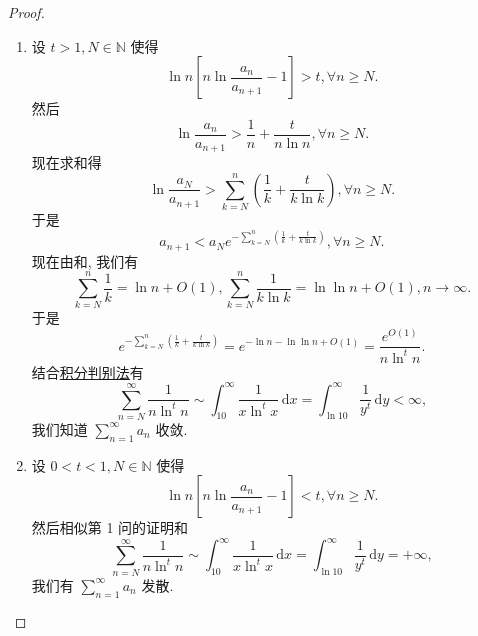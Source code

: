 \documentclass[../../main.tex]{subfiles}
\begin{document}
\begin{proof}
\begin{enumerate}
\item 设 \( t > 1, N \in \mathbb{N} \) 使得
\[
\ln n \left[ n \ln \frac{a_n}{a_{n + 1}} - 1 \right] > t, \forall n \geqslant N.
\]
然后
\[
\ln \frac{a_n}{a_{n + 1}} > \frac{1}{n} + \frac{t}{n \ln n}, \forall n \geqslant N.
\]
现在求和得
\[
\ln \frac{a_N}{a_{n + 1}} > \sum_{k=N}^n \left( \frac{1}{k} + \frac{t}{k \ln k} \right), \forall n \geqslant N.
\]
于是
\[
a_{n + 1} < a_N e^{-\sum\limits_{k=N}^n \left( \frac{1}{k} + \frac{t}{k \ln k} \right)}, \forall n \geqslant N.
\]
现在由和, 我们有
\[
\sum_{k=N}^n \frac{1}{k} = \ln n + O(1), \sum_{k=N}^n \frac{1}{k \ln k} = \ln \ln n + O(1), n \to \infty.
\]
于是
\[
e^{-\sum\limits_{k=N}^n \left( \frac{1}{k} + \frac{t}{k \ln k} \right)} = e^{-\ln n - \ln \ln n + O(1)} = \frac{e^{O(1)}}{n \ln^t n}.
\]
结合\hyperref[theorem:积分判别法]{积分判别法}有
\[
\sum_{n=N}^\infty \frac{1}{n \ln^t n} \sim \int_{10}^\infty \frac{1}{x \ln^t x} \, \mathrm{d}x = \int_{\ln 10}^\infty \frac{1}{y^t} \, \mathrm{d}y < \infty,
\]
我们知道 \( \sum_{n=1}^\infty a_n \) 收敛.

\item 设 \( 0 < t < 1, N \in \mathbb{N} \) 使得
\[
\ln n \left[ n \ln \frac{a_n}{a_{n + 1}} - 1 \right] < t, \forall n \geqslant N.
\]
然后相似第 1 问的证明和
\[
\sum_{n=N}^\infty \frac{1}{n \ln^t n} \sim \int_{10}^\infty \frac{1}{x \ln^t x} \, \mathrm{d}x = \int_{\ln 10}^\infty \frac{1}{y^t} \, \mathrm{d}y = +\infty,
\]
我们有 \( \sum_{n=1}^\infty a_n \) 发散.
\end{enumerate}

\end{proof}
\end{document}
